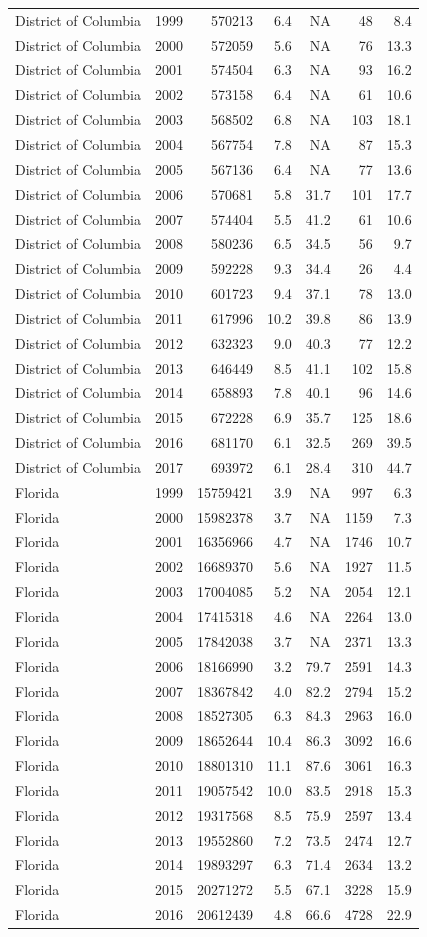 \documentclass[
]{article}
\begin{document}
\begin{longtable}[]{@{}lrrrrrr@{}}
District of Columbia & 1999 & 570213 & 6.4 & NA & 48 &
8.4\tabularnewline
District of Columbia & 2000 & 572059 & 5.6 & NA & 76 &
13.3\tabularnewline
District of Columbia & 2001 & 574504 & 6.3 & NA & 93 &
16.2\tabularnewline
District of Columbia & 2002 & 573158 & 6.4 & NA & 61 &
10.6\tabularnewline
District of Columbia & 2003 & 568502 & 6.8 & NA & 103 &
18.1\tabularnewline
District of Columbia & 2004 & 567754 & 7.8 & NA & 87 &
15.3\tabularnewline
District of Columbia & 2005 & 567136 & 6.4 & NA & 77 &
13.6\tabularnewline
District of Columbia & 2006 & 570681 & 5.8 & 31.7 & 101 &
17.7\tabularnewline
District of Columbia & 2007 & 574404 & 5.5 & 41.2 & 61 &
10.6\tabularnewline
District of Columbia & 2008 & 580236 & 6.5 & 34.5 & 56 &
9.7\tabularnewline
District of Columbia & 2009 & 592228 & 9.3 & 34.4 & 26 &
4.4\tabularnewline
District of Columbia & 2010 & 601723 & 9.4 & 37.1 & 78 &
13.0\tabularnewline
District of Columbia & 2011 & 617996 & 10.2 & 39.8 & 86 &
13.9\tabularnewline
District of Columbia & 2012 & 632323 & 9.0 & 40.3 & 77 &
12.2\tabularnewline
District of Columbia & 2013 & 646449 & 8.5 & 41.1 & 102 &
15.8\tabularnewline
District of Columbia & 2014 & 658893 & 7.8 & 40.1 & 96 &
14.6\tabularnewline
District of Columbia & 2015 & 672228 & 6.9 & 35.7 & 125 &
18.6\tabularnewline
District of Columbia & 2016 & 681170 & 6.1 & 32.5 & 269 &
39.5\tabularnewline
District of Columbia & 2017 & 693972 & 6.1 & 28.4 & 310 &
44.7\tabularnewline
Florida & 1999 & 15759421 & 3.9 & NA & 997 & 6.3\tabularnewline
Florida & 2000 & 15982378 & 3.7 & NA & 1159 & 7.3\tabularnewline
Florida & 2001 & 16356966 & 4.7 & NA & 1746 & 10.7\tabularnewline
Florida & 2002 & 16689370 & 5.6 & NA & 1927 & 11.5\tabularnewline
Florida & 2003 & 17004085 & 5.2 & NA & 2054 & 12.1\tabularnewline
Florida & 2004 & 17415318 & 4.6 & NA & 2264 & 13.0\tabularnewline
Florida & 2005 & 17842038 & 3.7 & NA & 2371 & 13.3\tabularnewline
Florida & 2006 & 18166990 & 3.2 & 79.7 & 2591 & 14.3\tabularnewline
Florida & 2007 & 18367842 & 4.0 & 82.2 & 2794 & 15.2\tabularnewline
Florida & 2008 & 18527305 & 6.3 & 84.3 & 2963 & 16.0\tabularnewline
Florida & 2009 & 18652644 & 10.4 & 86.3 & 3092 & 16.6\tabularnewline
Florida & 2010 & 18801310 & 11.1 & 87.6 & 3061 & 16.3\tabularnewline
Florida & 2011 & 19057542 & 10.0 & 83.5 & 2918 & 15.3\tabularnewline
Florida & 2012 & 19317568 & 8.5 & 75.9 & 2597 & 13.4\tabularnewline
Florida & 2013 & 19552860 & 7.2 & 73.5 & 2474 & 12.7\tabularnewline
Florida & 2014 & 19893297 & 6.3 & 71.4 & 2634 & 13.2\tabularnewline
Florida & 2015 & 20271272 & 5.5 & 67.1 & 3228 & 15.9\tabularnewline
Florida & 2016 & 20612439 & 4.8 & 66.6 & 4728 & 22.9\tabularnewline

\end{longtable}
\end{document}
